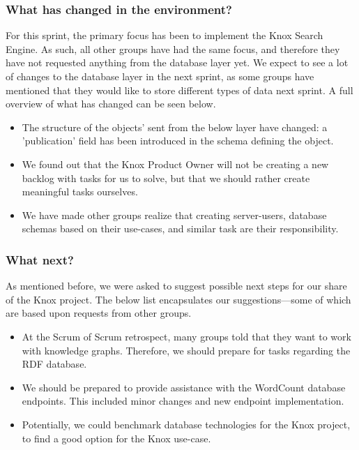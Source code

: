 \subsubsection{What has changed in the environment?}
For this sprint, the primary focus has been to implement the Knox Search Engine. As such, all other groups have had the same focus, and therefore they have not requested anything from the database layer yet. 
We expect to see a lot of changes to the database layer in the next sprint, as some groups have mentioned that they would like to store different types of data next sprint.
A full overview of what has changed can be seen below.

\begin{itemize}
    \item The structure of the objects' sent from the below layer have changed: a 'publication' field has been introduced in the schema defining the object.
    \item We found out that the Knox Product Owner will not be creating a new backlog with tasks for us to solve, but that we should rather create meaningful tasks ourselves.
    \item We have made other groups realize that creating server-users, database schemas based on their use-cases, and similar task are their responsibility.
\end{itemize}

\subsubsection{What next?}
As mentioned before, we were asked to suggest possible next steps for our share of the Knox project. The below list encapsulates our suggestions---some of which are based upon requests from other groups.

\begin{itemize}
    \item At the Scrum of Scrum retrospect, many groups told that they want to work with knowledge graphs. Therefore, we should prepare for tasks regarding the RDF database.
    \item We should be prepared to provide assistance with the WordCount database endpoints. This included minor changes and new endpoint implementation.
    \item Potentially, we could benchmark database technologies for the Knox project, to find a good option for the Knox use-case.
\end{itemize}